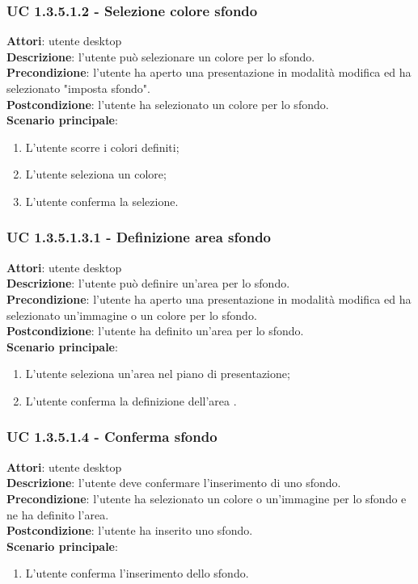 \subsubsection{UC 1.3.5.1.2 - Selezione colore sfondo}{
	\label{uc1.3.5.1.2}
	\textbf{Attori}: utente desktop \\
	\textbf{Descrizione}: l'utente può selezionare un colore per lo sfondo. \\
	\textbf{Precondizione}: l'utente ha aperto una presentazione in modalità modifica ed ha selezionato "imposta sfondo".	\\
	\textbf{Postcondizione}: l'utente ha selezionato un colore per lo sfondo.	\\
	\textbf{Scenario principale}:
	\begin{enumerate}
		\item L'utente scorre i colori definiti;
		\item L'utente seleziona un colore;
		\item L'utente conferma la selezione.
	\end{enumerate}
}
\subsubsection{UC 1.3.5.1.3.1 - Definizione area sfondo}{
	\label{uc1.3.5.1.3.1}
	\textbf{Attori}: utente desktop \\
	\textbf{Descrizione}: l'utente può definire un'area per lo sfondo. \\
	\textbf{Precondizione}: l'utente ha aperto una presentazione in modalità modifica ed ha selezionato un'immagine o un colore per lo sfondo.	\\
	\textbf{Postcondizione}: l'utente ha definito un'area per lo sfondo.	\\
	\textbf{Scenario principale}:
	\begin{enumerate}
		\item L'utente seleziona un'area nel piano di presentazione;
		\item L'utente conferma la definizione dell'area .
	\end{enumerate}
}

\subsubsection{UC 1.3.5.1.4 - Conferma sfondo}{
	\label{uc1.3.5.1.4}
	\textbf{Attori}: utente desktop \\
	\textbf{Descrizione}: l'utente deve confermare l'inserimento di uno sfondo. \\
	\textbf{Precondizione}: l'utente ha selezionato un colore o un'immagine per lo sfondo e ne ha definito l'area.	\\
	\textbf{Postcondizione}: l'utente ha inserito uno sfondo.	\\
	\textbf{Scenario principale}:
	\begin{enumerate}
		\item L'utente conferma l'inserimento dello sfondo.
	\end{enumerate}
}
